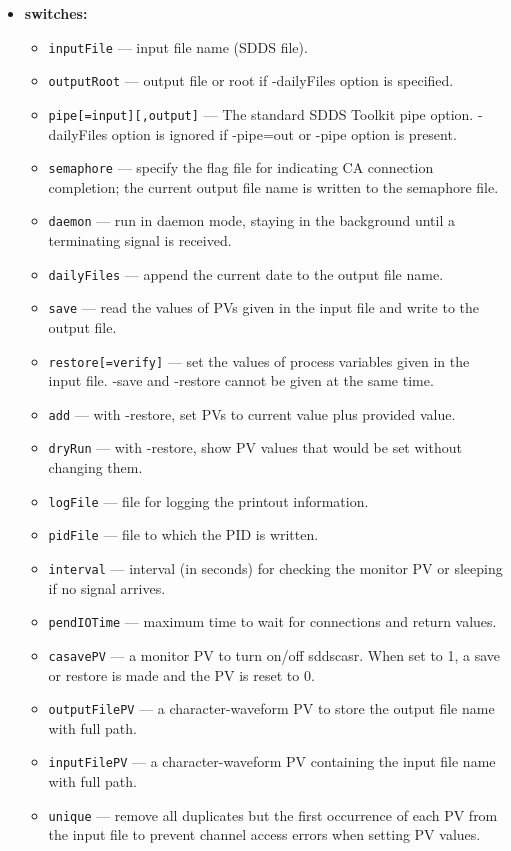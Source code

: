 \begin{itemize}
%
\item {\bf switches:}
%
%
  \begin{itemize}
  \item {\tt inputFile} --- input file name (SDDS file).
  \item {\tt outputRoot} --- output file or root if -dailyFiles option is specified.
  \item {\tt pipe[=input][,output]} --- The standard SDDS Toolkit pipe option.
        -dailyFiles option is ignored if -pipe=out or -pipe option is present.
  \item {\tt semaphore} --- specify the flag file for indicating CA connection completion;
        the current output file name is written to the semaphore file.
  \item {\tt daemon} --- run in daemon mode, staying in the background until a terminating signal is received.
  \item {\tt dailyFiles} --- append the current date to the output file name.
  \item {\tt save} --- read the values of PVs given in the input file and write to the output file.
  \item {\tt restore[=verify]} --- set the values of process variables given in the input file.
        -save and -restore cannot be given at the same time.
  \item {\tt add} --- with -restore, set PVs to current value plus provided value.
  \item {\tt dryRun} --- with -restore, show PV values that would be set without changing them.
  \item {\tt logFile} --- file for logging the printout information.
  \item {\tt pidFile} --- file to which the PID is written.
  \item {\tt interval} --- interval (in seconds) for checking the monitor PV or sleeping if no signal arrives.
  \item {\tt pendIOTime} --- maximum time to wait for connections and return values.
  \item {\tt casavePV} --- a monitor PV to turn on/off sddscasr. When set to 1, a save or restore is made and the PV is reset to 0.
  \item {\tt outputFilePV} --- a character-waveform PV to store the output file name with full path.
  \item {\tt inputFilePV} --- a character-waveform PV containing the input file name with full path.
  \item {\tt unique} --- remove all duplicates but the first occurrence of each PV from the input file to prevent channel access errors when setting PV values.

\end{itemize}
\end{itemize}
